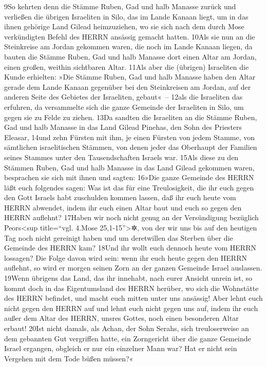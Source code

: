 9So kehrten denn die Stämme Ruben, Gad und halb Manasse zurück und
verließen die übrigen Israeliten in Silo, das im Lande Kanaan liegt, um
in das ihnen gehörige Land Gilead heimzuziehen, wo sie sich nach dem
durch Mose verkündigten Befehl des HERRN ansässig gemacht hatten. 10Als
sie nun an die Steinkreise am Jordan gekommen waren, die noch im Lande
Kanaan liegen, da bauten die Stämme Ruben, Gad und halb Manasse dort
einen Altar am Jordan, einen großen, weithin sichtbaren Altar. 11Als
aber die (übrigen) Israeliten die Kunde erhielten: »Die Stämme Ruben,
Gad und halb Manasse haben den Altar gerade dem Lande Kanaan gegenüber
bei den Steinkreisen am Jordan, auf der anderen Seite des Gebietes der
Israeliten, gebaut«~-- 12als die Israeliten das erfuhren, da versammelte
sich die ganze Gemeinde der Israeliten in Silo, um gegen sie zu Felde zu
ziehen. 13Da sandten die Israeliten an die Stämme Ruben, Gad und halb
Manasse in das Land Gilead Pinehas, den Sohn des Priesters Eleasar,
14und zehn Fürsten mit ihm, je einen Fürsten von jedem Stamme, von
sämtlichen israelitischen Stämmen, von denen jeder das Oberhaupt der
Familien seines Stammes unter den Tausendschaften Israels war. 15Als
diese zu den Stämmen Ruben, Gad und halb Manasse in das Land Gilead
gekommen waren, besprachen sie sich mit ihnen und sagten: 16»Die ganze
Gemeinde des HERRN läßt euch folgendes sagen: Was ist das für eine
Treulosigkeit, die ihr euch gegen den Gott Israels habt zuschulden
kommen lassen, daß ihr euch heute vom HERRN abwendet, indem ihr euch
einen Altar baut und euch so gegen den HERRN auflehnt? 17Haben wir noch
nicht genug an der Versündigung bezüglich Peors\textless sup
title=``vgl. 4.Mose 25,1-15''\textgreater✲, von der wir uns bis auf den
heutigen Tag noch nicht gereinigt haben und um deretwillen das Sterben
über die Gemeinde des HERRN kam? 18Und ihr wollt euch dennoch heute vom
HERRN lossagen? Die Folge davon wird sein: wenn ihr euch heute gegen den
HERRN auflehnt, so wird er morgen seinen Zorn an der ganzen Gemeinde
Israel auslassen. 19Wenn übrigens das Land, das ihr innehabt, nach eurer
Ansicht unrein ist, so kommt doch in das Eigentumsland des HERRN
herüber, wo sich die Wohnstätte des HERRN befindet, und macht euch
mitten unter uns ansässig! Aber lehnt euch nicht gegen den HERRN auf und
lehnt euch nicht gegen uns auf, indem ihr euch außer dem Altar des
HERRN, unsres Gottes, noch einen besonderen Altar erbaut! 20Ist nicht
damals, als Achan, der Sohn Serahs, sich treuloserweise an dem gebannten
Gut vergriffen hatte, ein Zorngericht über die ganze Gemeinde Israel
ergangen, obgleich er nur ein einzelner Mann war? Hat er nicht sein
Vergehen mit dem Tode büßen müssen?«

